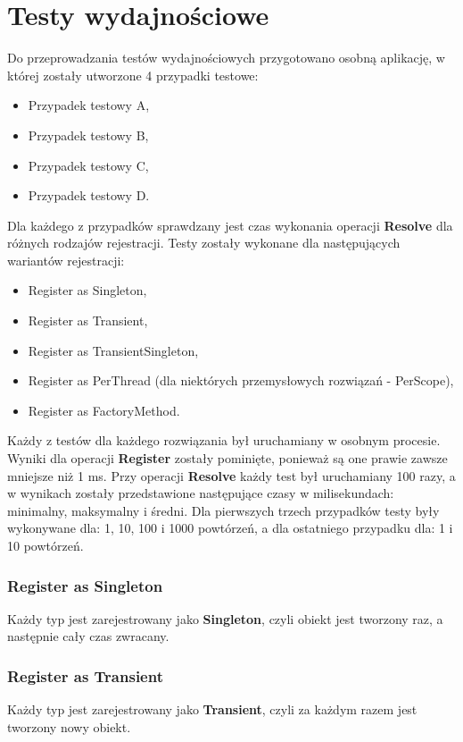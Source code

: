 \documentclass[12pt]{article}
\begin{document}
\clearpage
\section{Testy wydajnościowe}
Do przeprowadzania testów wydajnościowych przygotowano osobną aplikację, w której zostały utworzone 4 przypadki testowe:
\begin{itemize}
	\item Przypadek testowy A,
	\item Przypadek testowy B,
	\item Przypadek testowy C,
	\item Przypadek testowy D.
\end{itemize}
Dla każdego z przypadków sprawdzany jest czas wykonania operacji \textbf{Resolve} dla różnych rodzajów rejestracji. Testy zostały wykonane dla następujących wariantów rejestracji:
\begin{itemize}
	\item Register as Singleton,
	\item Register as Transient,
	\item Register as TransientSingleton,
	\item Register as PerThread (dla niektórych przemysłowych rozwiązań - PerScope),
	\item Register as FactoryMethod.
\end{itemize}
Każdy z testów dla każdego rozwiązania był uruchamiany w osobnym procesie. Wyniki dla operacji \textbf{Register} zostały pominięte, ponieważ są one prawie zawsze mniejsze niż 1 ms. Przy operacji \textbf{Resolve} każdy test był uruchamiany 100 razy, a w wynikach zostały przedstawione następujące czasy w milisekundach: minimalny, maksymalny i średni. Dla pierwszych trzech przypadków testy były wykonywane dla: 1, 10, 100 i 1000 powtórzeń, a dla ostatniego przypadku dla: 1 i 10 powtórzeń.

\subsubsection{Register as Singleton}
Każdy typ jest zarejestrowany jako \textbf{Singleton}, czyli obiekt jest tworzony raz, a następnie cały czas zwracany.

\subsubsection{Register as Transient}
Każdy typ jest zarejestrowany jako \textbf{Transient}, czyli za każdym razem jest tworzony nowy obiekt.
\end{document}
